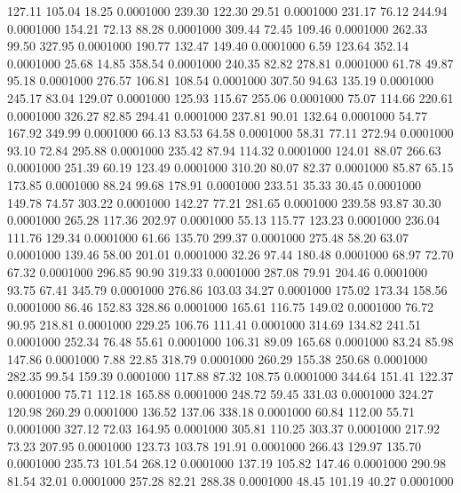  127.11  105.04   18.25   0.0001000
 239.30  122.30   29.51   0.0001000
 231.17   76.12  244.94   0.0001000
 154.21   72.13   88.28   0.0001000
 309.44   72.45  109.46   0.0001000
 262.33   99.50  327.95   0.0001000
 190.77  132.47  149.40   0.0001000
   6.59  123.64  352.14   0.0001000
  25.68   14.85  358.54   0.0001000
 240.35   82.82  278.81   0.0001000
  61.78   49.87   95.18   0.0001000
 276.57  106.81  108.54   0.0001000
 307.50   94.63  135.19   0.0001000
 245.17   83.04  129.07   0.0001000
 125.93  115.67  255.06   0.0001000
  75.07  114.66  220.61   0.0001000
 326.27   82.85  294.41   0.0001000
 237.81   90.01  132.64   0.0001000
  54.77  167.92  349.99   0.0001000
  66.13   83.53   64.58   0.0001000
  58.31   77.11  272.94   0.0001000
  93.10   72.84  295.88   0.0001000
 235.42   87.94  114.32   0.0001000
 124.01   88.07  266.63   0.0001000
 251.39   60.19  123.49   0.0001000
 310.20   80.07   82.37   0.0001000
  85.87   65.15  173.85   0.0001000
  88.24   99.68  178.91   0.0001000
 233.51   35.33   30.45   0.0001000
 149.78   74.57  303.22   0.0001000
 142.27   77.21  281.65   0.0001000
 239.58   93.87   30.30   0.0001000
 265.28  117.36  202.97   0.0001000
  55.13  115.77  123.23   0.0001000
 236.04  111.76  129.34   0.0001000
  61.66  135.70  299.37   0.0001000
 275.48   58.20   63.07   0.0001000
 139.46   58.00  201.01   0.0001000
  32.26   97.44  180.48   0.0001000
  68.97   72.70   67.32   0.0001000
 296.85   90.90  319.33   0.0001000
 287.08   79.91  204.46   0.0001000
  93.75   67.41  345.79   0.0001000
 276.86  103.03   34.27   0.0001000
 175.02  173.34  158.56   0.0001000
  86.46  152.83  328.86   0.0001000
 165.61  116.75  149.02   0.0001000
  76.72   90.95  218.81   0.0001000
 229.25  106.76  111.41   0.0001000
 314.69  134.82  241.51   0.0001000
 252.34   76.48   55.61   0.0001000
 106.31   89.09  165.68   0.0001000
  83.24   85.98  147.86   0.0001000
   7.88   22.85  318.79   0.0001000
 260.29  155.38  250.68   0.0001000
 282.35   99.54  159.39   0.0001000
 117.88   87.32  108.75   0.0001000
 344.64  151.41  122.37   0.0001000
  75.71  112.18  165.88   0.0001000
 248.72   59.45  331.03   0.0001000
 324.27  120.98  260.29   0.0001000
 136.52  137.06  338.18   0.0001000
  60.84  112.00   55.71   0.0001000
 327.12   72.03  164.95   0.0001000
 305.81  110.25  303.37   0.0001000
 217.92   73.23  207.95   0.0001000
 123.73  103.78  191.91   0.0001000
 266.43  129.97  135.70   0.0001000
 235.73  101.54  268.12   0.0001000
 137.19  105.82  147.46   0.0001000
 290.98   81.54   32.01   0.0001000
 257.28   82.21  288.38   0.0001000
  48.45  101.19   40.27   0.0001000
